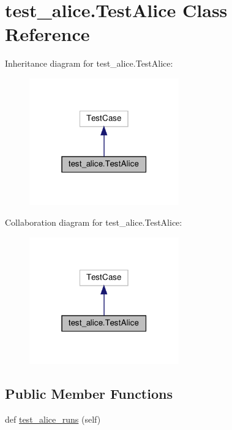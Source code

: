 \hypertarget{classtest__alice_1_1TestAlice}{}\section{test\+\_\+alice.\+Test\+Alice Class Reference}
\label{classtest__alice_1_1TestAlice}


Inheritance diagram for test\+\_\+alice.\+Test\+Alice\+:
\nopagebreak
\begin{figure}[H]
\begin{center}
\leavevmode
\includegraphics[width=183pt]{de/ded/classtest__alice_1_1TestAlice__inherit__graph}
\end{center}
\end{figure}


Collaboration diagram for test\+\_\+alice.\+Test\+Alice\+:
\nopagebreak
\begin{figure}[H]
\begin{center}
\leavevmode
\includegraphics[width=183pt]{dc/d48/classtest__alice_1_1TestAlice__coll__graph}
\end{center}
\end{figure}
\subsection*{Public Member Functions}
\begin{DoxyCompactItemize}
\item 
def \hyperlink{classtest__alice_1_1TestAlice_a3a80164e5af443ea6f7027e2e653c616}{test\+\_\+alice\+\_\+runs} (self)
\end{DoxyCompactItemize}


